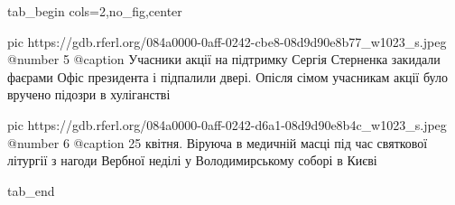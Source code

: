  
 
 
 
 


\ifcmt
  tab_begin cols=2,no_fig,center

     pic https://gdb.rferl.org/084a0000-0aff-0242-cbe8-08d9d90e8b77_w1023_s.jpeg
		 @number 5
		 @caption Учасники акції на підтримку Сергія Стерненка закидали фаєрами Офіс президента і підпалили двері. Опісля сімом учасникам акції було вручено підозри в хуліганстві

		 pic https://gdb.rferl.org/084a0000-0aff-0242-d6a1-08d9d90e8b4c_w1023_s.jpeg
		 @number 6
		 @caption 25 квітня. Віруюча в медичній масці під час святкової літургії з нагоди Вербної неділі у Володимирському соборі в Києві 

  tab_end
\fi
